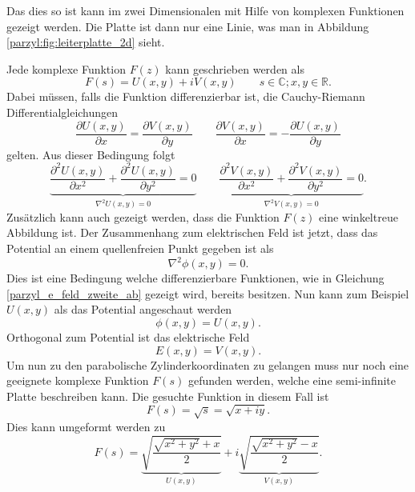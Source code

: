 Das dies so ist kann im zwei Dimensionalen mit Hilfe von komplexen Funktionen gezeigt werden. Die Platte ist dann nur eine Linie, was man in Abbildung \ref{parzyl:fig:leiterplatte_2d} sieht.

Jede komplexe Funktion $F(z)$ kann geschrieben werden als
\begin{equation}
	F(s) = U(x,y) + iV(x,y) \qquad s \in \mathbb{C}; x,y \in \mathbb{R}.
\end{equation}  
Dabei müssen, falls die Funktion differenzierbar ist, die Cauchy-Riemann Differentialgleichungen 
\begin{equation}
	\frac{\partial U(x,y)}{\partial x} 
	=
	\frac{\partial V(x,y)}{\partial y} 
	\qquad
	\frac{\partial V(x,y)}{\partial x}
	=
	-\frac{\partial U(x,y)}{\partial y}
\end{equation}
gelten.
Aus dieser Bedingung folgt 
\begin{equation}
	\label{parzyl_e_feld_zweite_ab}
	\underbrace{
	\frac{\partial^2 U(x,y)}{\partial x^2}
	+ 
	\frac{\partial^2 U(x,y)}{\partial y^2}
	=
	0
	}_{\displaystyle{\nabla^2U(x,y)=0}}
	\qquad
	\underbrace{
	\frac{\partial^2 V(x,y)}{\partial x^2}
	+
	\frac{\partial^2 V(x,y)}{\partial y^2}
	=
	0
	}_{\displaystyle{\nabla^2V(x,y) = 0}}.
\end{equation}
Zusätzlich kann auch gezeigt werden, dass die Funktion $F(z)$ eine winkeltreue Abbildung ist. 
Der Zusammenhang zum elektrischen Feld ist jetzt, dass das Potential an einem quellenfreien Punkt gegeben ist als 
\begin{equation}
	\nabla^2\phi(x,y) = 0.
\end{equation}
Dies ist eine Bedingung welche differenzierbare Funktionen, wie in Gleichung \eqref{parzyl_e_feld_zweite_ab} gezeigt wird, bereits besitzen. 
Nun kann zum Beispiel $U(x,y)$ als das Potential angeschaut werden
\begin{equation}
	\phi(x,y) = U(x,y).
\end{equation}
Orthogonal zum Potential ist das elektrische Feld
\begin{equation}
	E(x,y) = V(x,y).
\end{equation}
Um nun zu den parabolische Zylinderkoordinaten zu gelangen muss nur noch eine geeignete 
komplexe Funktion $F(s)$ gefunden werden, 
welche eine semi-infinite Platte beschreiben kann.
Die gesuchte Funktion in diesem Fall ist
\begin{equation}
	F(s) 
	= 
	\sqrt{s} 
	= 
	\sqrt{x + iy}.
\end{equation}
Dies kann umgeformt werden zu
\begin{equation}
	F(s) 
	= 
	\underbrace{\sqrt{\frac{\sqrt{x^2+y^2} + x}{2}}}_{U(x,y)} 
	+ 
	i\underbrace{\sqrt{\frac{\sqrt{x^2+y^2} - x}{2}}}_{V(x,y)}
	.
\end{equation}
